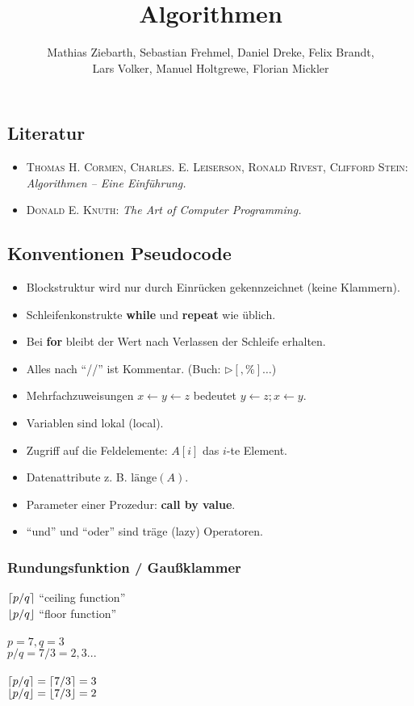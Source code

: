 \documentclass[a4paper]{scrartcl}
\title{Algorithmen}
\author{Mathias Ziebarth, Sebastian Frehmel, Daniel Dreke, Felix Brandt,\\ Lars Volker, Manuel Holtgrewe, Florian Mickler}
\begin{document}
\maketitle


\subsection*{Literatur}
\begin{itemize}
\item \textsc{Thomas H. Cormen, Charles. E. Leiserson,
Ronald Rivest, Clifford Stein:} \emph{Algorithmen -- Eine Einführung.}
\item \textsc{Donald E. Knuth:} \emph{The Art of Computer Programming.} %
\end {itemize}

\subsection* {Konventionen Pseudocode}
\begin{itemize}
\item Blockstruktur wird nur durch Einrücken gekennzeichnet (keine Klammern).
\item Schleifenkonstrukte \textbf{while} und \textbf{repeat} wie üblich.
\item Bei \textbf{for} bleibt der Wert nach Verlassen der Schleife erhalten.
\item Alles nach "`//"' ist Kommentar. (Buch: $\rhd [, \%] \dots$)
\item Mehrfachzuweisungen $x \leftarrow y \leftarrow z$ bedeutet $y \leftarrow z; x \leftarrow y$.
\item Variablen sind lokal (local).
\item Zugriff auf die Feldelemente: $A[i]$ das $i$-te Element.
\item Datenattribute z. B. $\text{länge}(A)$.
\item Parameter einer Prozedur: \textbf{call by value}.
\item "`und"' und "`oder"' sind träge (lazy) Operatoren.
\end{itemize}


\subsubsection*{Rundungsfunktion / Gaußklammer}

$\left\lceil p / q \right\rceil$ "`ceiling function"' \\
$\left\lfloor p / q \right\rfloor$ "`floor function"' \\ 
\\
$p = 7, q = 3$ \\
$p/q = 7/3 = 2,3...$ \\
\\
$\left\lceil p / q \right\rceil = \left\lceil 7 / 3 \right\rceil = 3$ \\
$\left\lfloor p / q \right\rfloor = \left\lfloor 7 / 3 \right\rfloor = 2$
\end{document}
